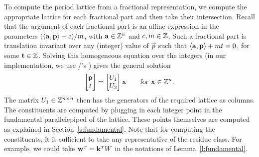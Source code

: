 To compute the period lattice from a fractional representation, we compute
the appropriate lattice for each fractional part and then take their intersection.
Recall that the argument of each fractional part is an affine expression
in the parameters $(\sp a p + c)/m$,
with $\vec a \in \ZZ^n$ and $c, m \in \mathbb{Z}$.
Such a fractional part is translation invariant over
any (integer) value of $\vec p$
such that $\sp a p + m t = 0$, for some $\vec t \in \ZZ$.
Solving this homogeneous equation over the integers (in our implementation,
we use \PolyLib/'s ) gives the general solution
$$
\begin{bmatrix}
\vec p \\ t
\end{bmatrix}
=
\begin{bmatrix}
U_1 \\ U_2
\end{bmatrix}
\vec x
\qquad\text{for $\vec x \in \ZZ^n$}
.
$$
The matrix $U_1 \in \mathbb{Z}^{n \times n}$ then has the generators of
the required lattice as columns.
The constituents are computed by plugging in each integer point
in the fundamental parallelepiped of the lattice.
These points themselves are computed as explained in Section~\ref{s:fundamental}.
Note that for computing the constituents, it is sufficient to take any
representative of the residue class.  For example, we could take
$\vec w^\T = \vec k^\T W$ in the notations of Lemma~\ref{l:fundamental}.

